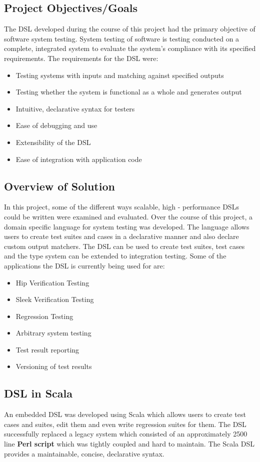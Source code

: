 \documentclass[12pt]{article}
\begin{document}
\newpage
\subsection{Project Objectives/Goals}
The DSL developed during the course of this project had the primary objective of software system testing. System testing of software is testing conducted on a complete, integrated system to evaluate the system's compliance with its specified requirements. The requirements for the DSL were:
\begin{itemize}
\item Testing systems with inputs and matching against specified outputs
\item Testing whether the system is functional as a whole and generates output
\item Intuitive, declarative syntax for testers
\item Ease of debugging and use
\item Extensibility of the DSL
\item Ease of integration with application code
\end{itemize}


\subsection{Overview of Solution}
In this project, some of the different ways scalable, high - performance DSLs could be written were examined and evaluated. Over the course of this project, a domain specific language for system testing was developed. The language allows users to create test suites and cases in a declarative manner and also declare custom output matchers. The DSL can be used to create test suites, test cases and the type system can be extended to integration testing. Some of the applications the DSL is currently being used for are:
\begin{itemize}
\item Hip Verification Testing
\item Sleek Verification Testing
\item Regression Testing
\item Arbitrary system testing
\item Test result reporting
\item Versioning of test results
\end{itemize}

\subsection{DSL in Scala}
An embedded DSL was developed using Scala which allows users to create test cases and suites, edit them and even write regression suites for them. The DSL successfully replaced a legacy system which consisted of an approximately 2500 line \textbf{Perl script} which was tightly coupled and hard to maintain. The Scala DSL provides a maintainable, concise, declarative syntax.
\bigskip
\end{document}
